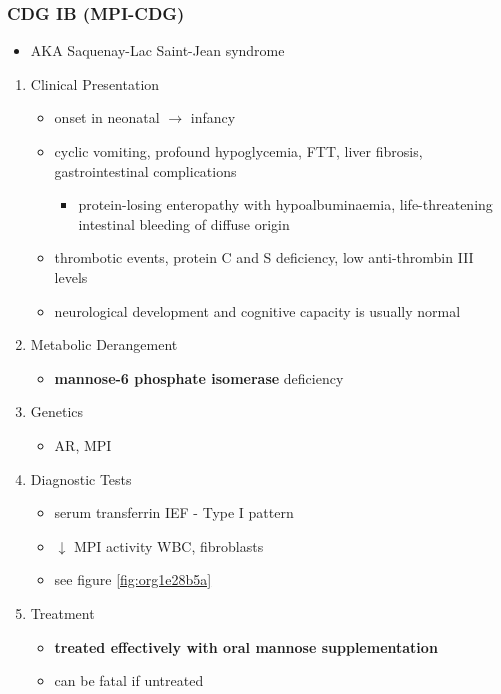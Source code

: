 \documentclass[12pt]{scrartcl}
\begin{document}
\subsubsection{CDG IB (MPI-CDG)}
\label{sec:orgb54e0a4}
\begin{itemize}
\item AKA Saquenay-Lac Saint-Jean syndrome
\end{itemize}
\begin{enumerate}
\item Clinical Presentation
\label{sec:orgdd3b18f}
\begin{itemize}
\item onset in neonatal \(\to\) infancy
\item cyclic vomiting, profound hypoglycemia, FTT, liver
fibrosis, gastrointestinal complications
\begin{itemize}
\item protein-losing enteropathy with hypoalbuminaemia, life-threatening
intestinal bleeding of diffuse origin
\end{itemize}
\item thrombotic events, protein C and S deficiency, low anti-thrombin III levels
\item neurological development and cognitive capacity is usually normal
\end{itemize}

\item Metabolic Derangement
\label{sec:orgbc9ceab}
\begin{itemize}
\item \textbf{mannose-6 phosphate isomerase} deficiency
\end{itemize}


\item Genetics
\label{sec:org231c973}
\begin{itemize}
\item AR, MPI
\end{itemize}

\item Diagnostic Tests
\label{sec:orgd6dfb1f}
\begin{itemize}
\item serum transferrin IEF - Type I pattern
\item \(\downarrow\) MPI activity WBC, fibroblasts
\item see figure \ref{fig:org1e28b5a}
\end{itemize}
\item Treatment
\label{sec:orge2cb2e4}
\begin{itemize}
\item \textbf{treated effectively with oral mannose supplementation}
\item can be fatal if untreated
\end{itemize}
\end{enumerate}
\end{document}
